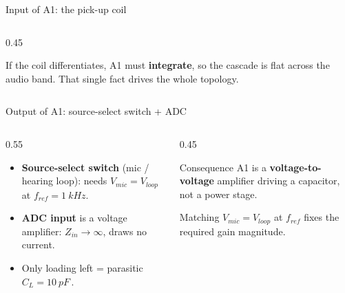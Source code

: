 \documentclass[aspectratio=169,9pt]{beamer}
\newcommand{\hl}[1]{\colorbox{tudyellow!55}{\,$#1$\,}}
\begin{document}
\begin{frame}{Input of A1: the pick-up coil}
  \begin{columns}[T]
    \begin{column}{0.45\textwidth}
      \begin{whybox}
      If the coil differentiates, A1 must \textbf{integrate}, so the cascade is flat across
      the audio band. That single fact drives the whole topology.
      \end{whybox}
    \end{column}
  \end{columns}
\end{frame}

\begin{frame}{Output of A1: source-select switch + ADC}
  \begin{columns}[T]
    \begin{column}{0.55\textwidth}
      \begin{itemize}
        \item \textbf{Source-select switch} (mic / hearing loop): needs $V_{mic}=V_{loop}$ at
          $f_{ref}=\SI{1}{kHz}$.
        \item \textbf{ADC input} is a voltage amplifier: $Z_{in}\to\infty$, draws no current.
        \item Only loading left = parasitic \hl{C_L=\SI{10}{pF}}.
      \end{itemize}
    \end{column}
    \begin{column}{0.45\textwidth}
      \begin{block}{Consequence}
        A1 is a \textbf{voltage-to-voltage} amplifier driving a capacitor, not a power stage.
      \end{block}
      \begin{whybox}
      Matching $V_{mic}=V_{loop}$ at $f_{ref}$ fixes the required gain magnitude.
      \end{whybox}
    \end{column}
  \end{columns}
\end{frame}
\end{document}
